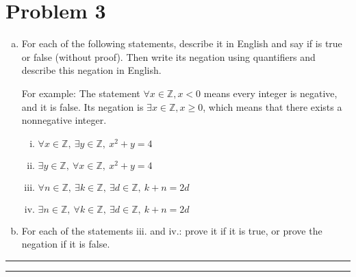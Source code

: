 \documentclass{article}
\theoremstyle{definition}
\newenvironment{solution}{\bigskip\hrule{\hfill}}{\bigskip\hrule{\hfill}} %
\begin{document}

\newpage


\section*{Problem 3}
\begin{enumerate}[a)] %
    \item For each of the following statements, describe it in English and say if is true or false (without proof). Then write its negation using quantifiers and describe this negation in English. \medskip

    For example: The statement $\forall x\in\mathbb{Z},x<0$ means every integer is negative, and it is false. Its negation is $\exists x\in\mathbb{Z},x\geq 0$, which means that there exists a nonnegative integer.
    \begin{enumerate}[i.] %
        \item $\forall x\in\mathbb{Z},~\exists y\in\mathbb{Z},~x^2+y=4$
        \item $\exists y\in\mathbb{Z},~\forall x\in\mathbb{Z},~x^2+y=4$
        \item $\forall n\in\mathbb{Z},~\exists k\in\mathbb{Z},~\exists d\in\mathbb{Z},~k+n=2d$
        \item $\exists n\in\mathbb{Z},~\forall k\in\mathbb{Z},~\exists d\in\mathbb{Z},~k+n=2d$
    \end{enumerate}
    \item For each of the statements iii. and iv.: prove it if it is true, or prove the negation if it is false.
\end{enumerate}
\begin{solution}


\end{solution}

\end{document}
